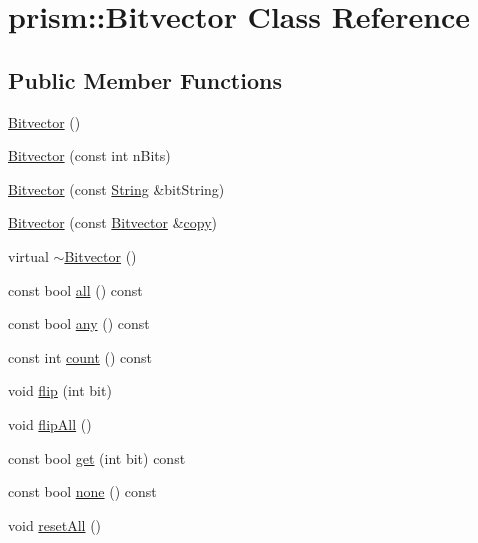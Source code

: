 \hypertarget{classprism_1_1_bitvector}{}\section{prism\+:\+:Bitvector Class Reference}
\label{classprism_1_1_bitvector}
\subsection*{Public Member Functions}
\begin{DoxyCompactItemize}
\item 
\hyperlink{classprism_1_1_bitvector_a41d5de4bbd7bf193121a1614cf6b3b3b}{Bitvector} ()
\item 
\hyperlink{classprism_1_1_bitvector_ae2c403debb39b93d7de3317deb0daeeb}{Bitvector} (const int n\+Bits)
\item 
\hyperlink{classprism_1_1_bitvector_aaf4223cb87ea463a8f329a5599644314}{Bitvector} (const \hyperlink{classprism_1_1_string}{String} \&bit\+String)
\item 
\hyperlink{classprism_1_1_bitvector_a9b0b8f78113cbce3082f2c67fb702a6c}{Bitvector} (const \hyperlink{classprism_1_1_bitvector}{Bitvector} \&\hyperlink{namespaceprism_ae776f4cd825f79e7af1cf6ee1d90a209}{copy})
\item 
virtual \hyperlink{classprism_1_1_bitvector_af3156224afd596027bf9dca1171bd9a5}{$\sim$\+Bitvector} ()
\item 
const bool \hyperlink{classprism_1_1_bitvector_ae67b760618f6bf396afb68352a5dfcad}{all} () const 
\item 
const bool \hyperlink{classprism_1_1_bitvector_ad055160febd837c0c7b5586821c383f0}{any} () const 
\item 
const int \hyperlink{classprism_1_1_bitvector_a62458e0b7d104c8897124ba7e858b34c}{count} () const 
\item 
void \hyperlink{classprism_1_1_bitvector_aaa5007377d0c3ff1340967e6fa2b81a1}{flip} (int bit)
\item 
void \hyperlink{classprism_1_1_bitvector_a9133aaa30ecd6393a96932e5721c6a2d}{flip\+All} ()
\item 
const bool \hyperlink{classprism_1_1_bitvector_a0a3d203905a1125a2afbdd928997dbe2}{get} (int bit) const 
\item 
const bool \hyperlink{classprism_1_1_bitvector_a33d1e72acbab4fb32eb24ddf72adc0cd}{none} () const 
\item 
void \hyperlink{classprism_1_1_bitvector_abdf123d4a94086c5525ce7d8eed8a6e3}{reset\+All} ()

\end{DoxyCompactItemize}
